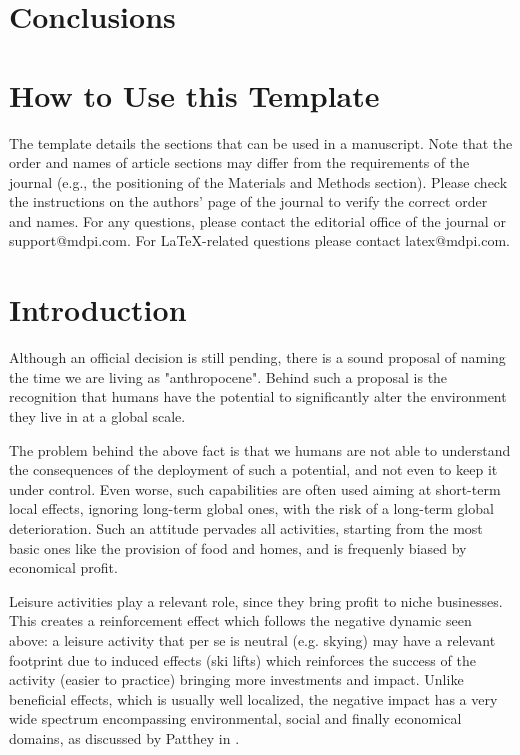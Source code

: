 \documentclass[sustainability,article,submit,pdftex,moreauthors]{Definitions/mdpi}
\begin{document}
\section{Conclusions}


\setcounter{section}{-1} %
\section{How to Use this Template}

The template details the sections that can be used in a manuscript. Note that the order and names of article sections may differ from the requirements of the journal (e.g., the positioning of the Materials and Methods section). Please check the instructions on the authors' page of the journal to verify the correct order and names. For any questions, please contact the editorial office of the journal or support@mdpi.com. For LaTeX-related questions please contact latex@mdpi.com.%


\section{Introduction}

Although an official decision is still pending, there is a sound proposal of naming the time we are living as "anthropocene". Behind such a proposal is the recognition that humans have the potential to significantly alter the environment they live in at a global scale.

The problem behind the above fact is that we humans are not able to understand the consequences of the deployment of such a potential, and not even to keep it under control. Even worse, such capabilities are often used aiming at short-term local effects, ignoring long-term global ones, with the risk of a long-term global deterioration. Such an attitude pervades all activities, starting from the most basic ones like the provision of food and homes, and is frequenly biased by economical profit.

Leisure activities play a relevant role, since they bring profit to niche businesses. This creates a reinforcement effect which follows the negative dynamic seen above: a leisure activity that per se is neutral (e.g. skying) may have a relevant footprint due to induced effects (ski lifts) which reinforces the success of the activity (easier to practice) bringing more investments and impact. Unlike beneficial effects, which is usually well localized, the negative impact has a very wide spectrum encompassing environmental, social and finally economical domains, as discussed by Patthey in \cite{pat08a}.
\end{document}
